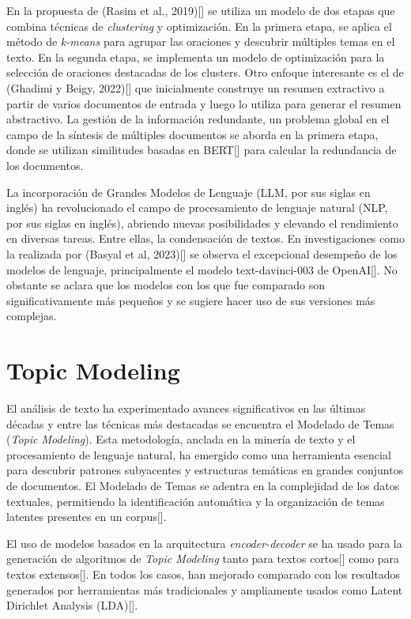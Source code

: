 En la propuesta de (Rasim et al., 2019)[\cite{cosum}] se utiliza un modelo de dos etapas que combina técnicas de \emph{clustering} y optimización. En la primera etapa, se aplica el método de \emph{k-means} para agrupar las oraciones y descubrir múltiples temas en el texto. En la segunda etapa, se implementa un modelo de optimización para la selección de oraciones destacadas de los clusters. Otro enfoque interesante es el de (Ghadimi y Beigy, 2022)[\cite{hybrid-llm}] que inicialmente construye un resumen extractivo a partir de varios documentos de entrada y luego lo utiliza para generar el resumen abstractivo. La gestión de la información redundante, un problema global en el campo de la síntesis de múltiples documentos se aborda en la primera etapa, donde se utilizan similitudes basadas en BERT[\cite{BERT}] para calcular la redundancia de los documentos.

La incorporación de Grandes Modelos de Lenguaje (LLM, por sus siglas en inglés) ha revolucionado el campo de procesamiento de lenguaje natural (NLP, por sus siglas en inglés), abriendo nuevas posibilidades y elevando el rendimiento en diversas tareas. Entre ellas, la condensación de textos. En investigaciones como la realizada por (Basyal et al, 2023)[\cite{basyal2023text}] se observa el excepcional desempeño de los modelos de lenguaje, principalmente el modelo text-davinci-003 de OpenAI[\cite{openai}]. No obstante se aclara que los modelos con los que fue comparado son significativamente más peque\~nos y se sugiere hacer uso de sus versiones más complejas.

\section{Topic Modeling}

    El análisis de texto ha experimentado avances significativos en las últimas décadas y entre las técnicas más destacadas se encuentra el Modelado de Temas (\emph{Topic Modeling}). Esta metodología, anclada en la minería de texto y el procesamiento de lenguaje natural, ha emergido como una herramienta esencial para descubrir patrones subyacentes y estructuras temáticas en grandes conjuntos de documentos. El Modelado de Temas se adentra en la complejidad de los datos textuales, permitiendo la identificación automática y la organización de temas latentes presentes en un corpus[\cite{lda2003}].

    El uso de modelos basados en la arquitectura \emph{encoder-decoder} se ha usado para la generación de algoritmos de \emph{Topic Modeling }tanto para textos cortos[\cite{neuraltm}] como para textos extensos[\cite{tminemb}]. En todos los casos, han mejorado comparado con los resultados generados por herramientas más tradicionales y ampliamente usados como Latent Dirichlet Analysis (LDA)[\cite{lda2003}].  

